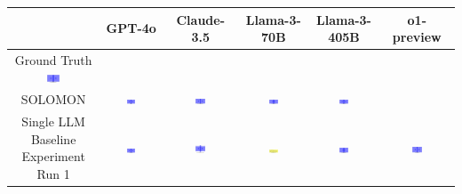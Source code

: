\begin{table}[H]
    \centering
    \begin{tabular}{|c|c|c|c|c|c|}
    \hline
    & GPT-4o & Claude-3.5 & Llama-3-70B & Llama-3-405B & o1-preview \\
    \hline
    Ground Truth {\includegraphics[width=0.15\textwidth]{examples_png/BasicLayout.png}} & & & & &  \\
    \hline
    SOLOMON & \includegraphics[width=0.15\textwidth]{./pool_all/png/gpt-4o_results/BasicLayout.png} & \includegraphics[width=0.15\textwidth]{./pool_all/png/claude-3-5-sonnet-20240620_results/BasicLayout.png} & \includegraphics[width=0.15\textwidth]{./pool_all/png/watsonx_meta-llama_llama-3-1-70b-instruct_results/BasicLayout.png} & \includegraphics[width=0.15\textwidth]{./pool_all/png/watsonx_meta-llama_llama-3-405b-instruct_results/BasicLayout.png} & \\
    \hline
    Single LLM Baseline Experiment Run 1 & \includegraphics[width=0.15\textwidth]{./run_1/png/gpt-4o_results/BasicLayout.png} & \includegraphics[width=0.15\textwidth]{./run_1/png/claude-3-5-sonnet-20240620_results/BasicLayout.png} & \includegraphics[width=0.15\textwidth]{./run_1/png/watsonx_meta-llama_llama-3-1-70b-instruct_results/BasicLayout.png} & \includegraphics[width=0.15\textwidth]{./run_1/png/watsonx_meta-llama_llama-3-405b-instruct_results/BasicLayout.png} & \includegraphics[width=0.15\textwidth]{./run_1/png/o1-preview_results/BasicLayout.png} \\

\end{tabular}
\end{table}
